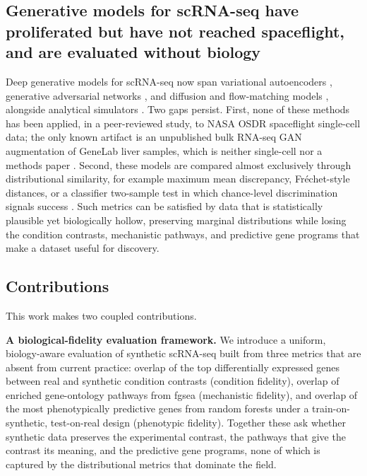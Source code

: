 \documentclass[11pt]{article}
\begin{document}
\subsection{Generative models for scRNA-seq have proliferated but have not reached spaceflight, and are evaluated without biology}
Deep generative models for scRNA-seq now span variational autoencoders \cite{scvi,activa}, generative adversarial networks \cite{scgan}, and diffusion and flow-matching models \cite{scdiffusion,cfdiffusion,cfgen}, alongside analytical simulators \cite{scgft,scdesign3,simbench}. Two gaps persist. First, none of these methods has been applied, in a peer-reviewed study, to NASA OSDR spaceflight single-cell data; the only known artifact is an unpublished bulk RNA-seq GAN augmentation of GeneLab liver samples, which is neither single-cell nor a methods paper \cite{osdr}. Second, these models are compared almost exclusively through distributional similarity, for example maximum mean discrepancy, Fr\'echet-style distances, or a classifier two-sample test in which chance-level discrimination signals success \cite{scgan,scdiffusion}. Such metrics can be satisfied by data that is statistically plausible yet biologically hollow, preserving marginal distributions while losing the condition contrasts, mechanistic pathways, and predictive gene programs that make a dataset useful for discovery.

\subsection{Contributions}
This work makes two coupled contributions.

\noindent\textbf{A biological-fidelity evaluation framework.} We introduce a uniform, biology-aware evaluation of synthetic scRNA-seq built from three metrics that are absent from current practice: overlap of the top differentially expressed genes between real and synthetic condition contrasts (condition fidelity), overlap of enriched gene-ontology pathways from fgsea (mechanistic fidelity), and overlap of the most phenotypically predictive genes from random forests under a train-on-synthetic, test-on-real design (phenotypic fidelity). Together these ask whether synthetic data preserves the experimental contrast, the pathways that give the contrast its meaning, and the predictive gene programs, none of which is captured by the distributional metrics that dominate the field.
\end{document}
